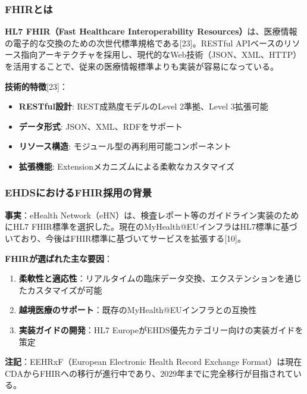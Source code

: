 \documentclass[
  a4paper,
  a4paper,
  11pt]{ltjsbook}
\providecommand{\tightlist}{%
  \setlength{\itemsep}{0pt}\setlength{\parskip}{0pt}}
\begin{document}
\subsubsection{FHIRとは}\label{fhirux3068ux306f}

\textbf{HL7 FHIR（Fast Healthcare Interoperability
Resources）}は、医療情報の電子的な交換のための次世代標準規格である{[}23{]}。RESTful
APIベースのリソース指向アーキテクチャを採用し、現代的なWeb技術（JSON、XML、HTTP）を活用することで、従来の医療情報標準よりも実装が容易になっている。

\textbf{技術的特徴}{[}23{]}：

\begin{itemize}
\tightlist
\item
  \textbf{RESTful設計}: REST成熟度モデルのLevel 2準拠、Level 3拡張可能
\item
  \textbf{データ形式}: JSON、XML、RDFをサポート
\item
  \textbf{リソース構造}: モジュール型の再利用可能コンポーネント
\item
  \textbf{拡張機能}: Extensionメカニズムによる柔軟なカスタマイズ
\end{itemize}

\subsubsection{EHDSにおけるFHIR採用の背景}\label{ehdsux306bux304aux3051ux308bfhirux63a1ux7528ux306eux80ccux666f}

\textbf{事実}：eHealth
Network（eHN）は、検査レポート等のガイドライン実装のためにHL7
FHIR標準を選択した。現在のMyHealth@EUインフラはHL7標準に基づいており、今後はFHIR標準に基づいてサービスを拡張する{[}10{]}。

\textbf{FHIRが選ばれた主な要因}：

\begin{enumerate}
\def\labelenumi{\arabic{enumi}.}
\tightlist
\item
  \textbf{柔軟性と適応性}：リアルタイムの臨床データ交換、エクステンションを通じたカスタマイズが可能
\item
  \textbf{越境医療のサポート}：既存のMyHealth@EUインフラとの互換性
\item
  \textbf{実装ガイドの開発}：HL7
  EuropeがEHDS優先カテゴリー向けの実装ガイドを策定
\end{enumerate}

\begin{tcolorbox}[enhanced jigsaw, toprule=.15mm, bottomtitle=1mm, coltitle=black, left=2mm, opacityback=0, arc=.35mm, colbacktitle=quarto-callout-note-color!10!white, colback=white, opacitybacktitle=0.6, bottomrule=.15mm, rightrule=.15mm, breakable, title=\textcolor{quarto-callout-note-color}{\faInfo}\hspace{0.5em}{Note}, toptitle=1mm, titlerule=0mm, colframe=quarto-callout-note-color-frame, leftrule=.75mm]

\textbf{注記}：EEHRxF（European Electronic Health Record Exchange
Format）は現在CDAからFHIRへの移行が進行中であり、2029年までに完全移行が目指されている。

\end{tcolorbox}
\end{document}
